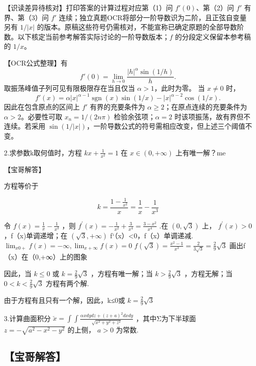 \documentclass[11pt,fontset=fandol]{ctexart}
\begin{document}
【识读差异待核对】打印答案的计算过程对应第（1）问 \(f'(0)\)、第（2）问
\(f'\) 有界、第（3）问 \(f'\)
连续；独立真题OCR将部分一阶导数识为二阶，且正弦自变量另有 \(1/|x|\)
的版本。原稿这些符号仍需核对，不能宣称已确定原题的全部导数阶数。以下核定当前参考解答实际讨论的一阶导数版本；\(f\)
的分段定义保留本参考稿的 \(1/x\)。

【OCR公式整理】有 \[
f'(0)=\lim_{h\to0}\frac{|h|^\alpha\sin(1/h)}h.
\] 取振荡峰值子列可见有限极限存在当且仅当 \(\alpha>1\)，此时为零。 当
\(x\ne0\) 时， \[
f'(x)=\alpha|x|^{\alpha-1}\operatorname{sgn}(x)\sin(1/x)
-|x|^{\alpha-2}\cos(1/x).
\] 因此在包含原点的区间上 \(f'\) 有界的充要条件为
\(\alpha\ge2\)；在原点连续的充要条件为 \(\alpha>2\)。必要性可取
\(x_n=1/(2n\pi)\) 检验余弦项；\(\alpha=2\)
时该项振荡，故有界但不连续。若采用
\(\sin(1/|x|)\)，一阶导数公式的符号需相应改变，但上述三个阈值不变。

2.求参数k取何值时，方程 \(k x + \frac { 1 } { x ^ { 2 } } = 1\) 在
\(x \in ( 0 , + \infty )\) 上有唯一解？me

【宝哥解答】

方程等价于

\[
k = \frac { 1 - \frac { 1 } { x ^ { 2 } } } { x } = \frac { 1 } { x } - \frac { 1 } { x ^ { 3 } }
\]

令 \(f ( x ) = \frac { 1 } { x } - \frac { 1 } { x ^ { 3 } }\) ，则
\(f ^ { \prime } ( x ) = - \frac { 1 } { x ^ { 2 } } + \frac { 3 } { x ^ { 4 } } = \frac { 3 - x ^ { 2 } } { x ^ { 4 } }\)
.在 \(( 0 , \sqrt { 3 } )\) 上， \(f ^ { \prime } ( x ) > 0\)
，f（x)单调递增；在 \(( { \sqrt { 3 } } , + \infty )\)
f`（x）\textless0，f（x）单调递减.
\(\lim _ { x  0 + } f ( x ) = - \infty , \lim _ { x  + \infty } f ( x ) = 0\)
\(f ( { \sqrt { 3 } } ) = \frac { x ^ { 2 } - 1 } { x ^ { 3 } } = \frac { 2 } { 3 { \sqrt { 3 } } } = \frac { 2 } { 9 } { \sqrt { 3 } }\)
画出f（x）在（0,+∞）上的图象

因此，当 \(k \leq 0\) 或 \(k = \frac { 2 } { 9 } \sqrt { 3 }\)
，方程有唯一解；当 \(k > \frac { 2 } { 9 } \sqrt { 3 }\) ，方程无解；当
\(0 < k < \frac { 2 } { 9 } \sqrt { 3 }\) 方程有两个解.

由于方程有且只有一个解，因此，k≤0或
\(k = \frac { 2 } { 9 } \sqrt { 3 }\)

3.计算曲面积分
\(\check { x } = \int \int \frac { \alpha x d y d z + ( z + a ) ^ { 2 } d x d y } { \sqrt { x ^ { 2 } + y ^ { 2 } + z ^ { 2 } } }\)
，其中Σ为下半球面 \(z = - \sqrt { a ^ { 2 } - x ^ { 2 } - y ^ { 2 } }\)
的上侧， \(a > 0\) 为常数.

\subsection{【宝哥解答】}\label{ux5b9dux54e5ux89e3ux7b54-3}
\end{document}
